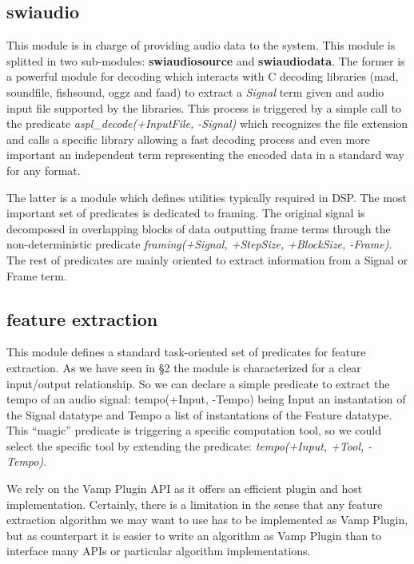 \documentclass[runningheads]{llncs}
\begin{document}
\subsection{swiaudio}\label{subsec:swiaudio}

This module is in charge of providing audio data to the system. This module is splitted in two sub-modules: \textbf{swiaudiosource} and \textbf{swiaudiodata}. The former is a powerful module for decoding which interacts with C decoding libraries (mad, soundfile, fishsound, oggz and faad) to extract a \textit{Signal} term given and audio input file supported by the libraries. This process is triggered by a simple call to the predicate \textit{aspl\_decode(+InputFile, -Signal)} which recognizes the file extension and calls a specific library allowing a fast decoding process and even more important an independent term representing the encoded data in a standard way for any format.

The latter is a module which defines utilities typically required in DSP. The most important set of predicates is dedicated to framing. The original signal is decomposed in overlapping blocks of data outputting frame terms through the non-deterministic predicate \textit{framing(+Signal, +StepSize, +BlockSize, -Frame)}. The rest of predicates are mainly oriented to extract information from a Signal or Frame term.
 
\subsection{feature extraction}\label{subsec:swivamp}

This module defines a standard task-oriented set of predicates for feature extraction. As we have seen in \S 2 the module is characterized for a clear input/output relationship. So we can declare a simple predicate to extract the tempo of an audio signal: tempo(+Input, -Tempo) being Input an instantation of the Signal datatype and Tempo a list of instantations of the Feature datatype. This ``magic'' predicate is triggering a specific computation tool, so we could select the specific tool by extending the predicate: \textit{tempo(+Input, +Tool, -Tempo)}.

We rely on the Vamp Plugin API as it offers an efficient plugin and host implementation. Certainly, there is a limitation in the sense that any feature extraction algorithm we may want to use has to be implemented as Vamp Plugin, but as counterpart it is easier to write an algorithm as Vamp Plugin than to interface many APIs or particular algorithm implementations.
\end{document}
